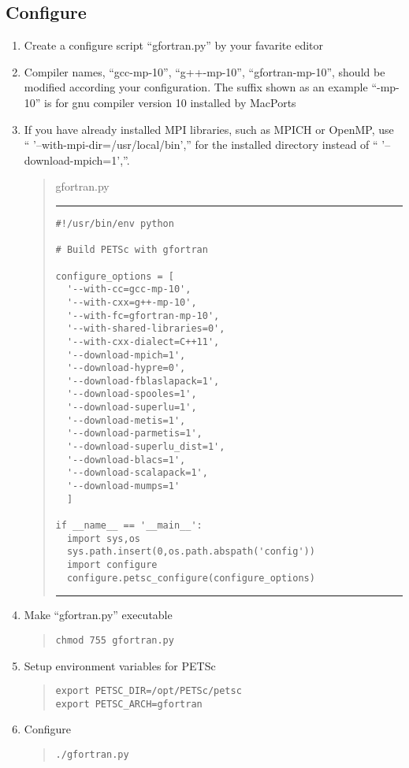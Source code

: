 \documentclass[11pt]{article}
\begin{document}
\subsection{Configure}
\begin{enumerate}
\item
  Create a configure script ``gfortran.py'' by your favarite editor
\item
  Compiler names, ``gcc-mp-10'', ``g++-mp-10'', ``gfortran-mp-10'',
  should be modified according your configuration.  The suffix shown
  as an example ``-mp-10'' is for gnu compiler version 10 installed by
  MacPorts
\item
  If you have already installed MPI libraries, such as MPICH or OpenMP, use
  ``  '--with-mpi-dir=/usr/local/bin','' for the installed directory instead
  of ``  '--download-mpich=1',''.

  
\begin{quote}
gfortran.py
\hrule
\begin{verbatim}
#!/usr/bin/env python

# Build PETSc with gfortran

configure_options = [
  '--with-cc=gcc-mp-10',
  '--with-cxx=g++-mp-10',
  '--with-fc=gfortran-mp-10',
  '--with-shared-libraries=0',
  '--with-cxx-dialect=C++11',
  '--download-mpich=1',
  '--download-hypre=0',
  '--download-fblaslapack=1',
  '--download-spooles=1',
  '--download-superlu=1',
  '--download-metis=1',
  '--download-parmetis=1',
  '--download-superlu_dist=1',
  '--download-blacs=1',
  '--download-scalapack=1',
  '--download-mumps=1'
  ]

if __name__ == '__main__':
  import sys,os
  sys.path.insert(0,os.path.abspath('config'))
  import configure
  configure.petsc_configure(configure_options)
\end{verbatim}
\hrule
\end{quote}
\item
Make ``gfortran.py'' executable
\begin{quote}
\begin{verbatim}
chmod 755 gfortran.py
\end{verbatim}
\end{quote}
\item
Setup environment variables for PETSc
\begin{quote}
\begin{verbatim}
export PETSC_DIR=/opt/PETSc/petsc
export PETSC_ARCH=gfortran
\end{verbatim}
\end{quote}
\item
Configure
\begin{quote}
\begin{verbatim}
./gfortran.py
\end{verbatim}
\end{quote}

\end{enumerate}
\end{document}

